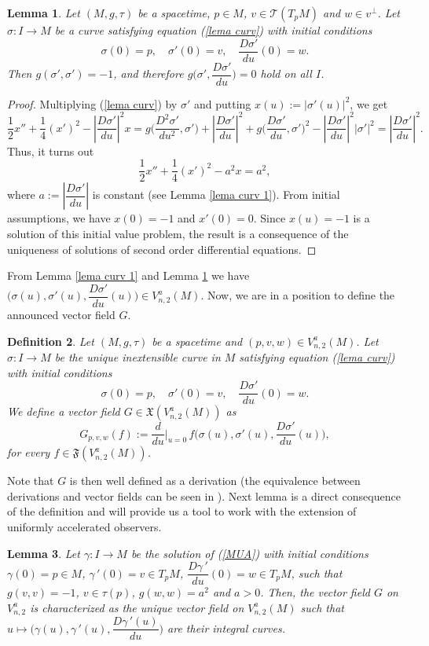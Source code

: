 \documentclass[11pt]{book}
\newtheorem{defi}{Definition}[chapter]
\newtheorem{lem}[defi]{Lemma}
\def\T{\mathcal T}
\def\F{\mathfrak F}
\def\x{\mathfrak X}
\begin{document}
\begin{lem}\label{lema curv 2}
	Let $(M,g,\tau)$ be a spacetime, $p\in M$, $v\in \T(T_{p}M)$ and $w\in v^\perp$.
	Let $\sigma:I\to M$ be a curve satisfying equation (\ref{lema curv}) with initial conditions 
	\[
	\sigma(0)=p, \quad \sigma'(0)=v, \quad \dfrac{D\sigma'}{du}(0)=w.
	\]
	Then $g(\sigma',\sigma')=-1$, and therefore $g\Big(\sigma',\dfrac{D\sigma'}{du}\Big)=0$ hold on all $I$.
\end{lem}
\begin{proof}
	Multiplying (\ref{lema curv}) by $\sigma'$ and putting $x(u):=|\sigma'(u)|^2$, we get
	\[
	\dfrac{1}{2} x'' +\dfrac{1}{4} (x')^2 - \left|\dfrac{D\sigma'}{du}\right|^2 x = g\Big(\dfrac{D^2\sigma'}{du^2},\sigma'\Big)+\left|\dfrac{D\sigma'}{du}\right|^2+g\Big(\dfrac{D\sigma'}{du},\sigma'\Big)^2-\left|\dfrac{D\sigma'}{du}\right|^2|\sigma'|^2 = \left|\dfrac{D\sigma'}{du}\right|^2.	
	\]
	Thus, it turns out
	\[
	\dfrac{1}{2} x'' +\dfrac{1}{4} (x')^2 -a^2 x= a^2,
	\]
	where $a:=\left|\dfrac{D\sigma'}{du}\right|$ is constant (see Lemma \ref{lema curv 1}).
	From initial assumptions, we have $x(0)=-1$ and $x'(0)=0$. Since $x(u)=-1$ is a solution of this initial value problem, the result is a consequence of the uniqueness of solutions of second order differential
	equations.
\end{proof}
From Lemma \ref{lema curv 1} and Lemma \ref{lema curv 2} we have $\Big(\sigma(u),\sigma'(u),\dfrac{D\sigma'}{du}(u)\Big)\in V_{n,2}^a(M)$. Now, we are in a position to define the announced vector field $G$.
\begin{defi}
	Let $(M,g,\tau)$ be a spacetime and $(p,v,w)\in V_{n,2}^a(M)$. Let $\sigma:I\to M$ be the unique inextensible curve in $M$ satisfying equation (\ref{lema curv}) with initial conditions
	\[
	\sigma(0)=p, \quad \sigma'(0)=v, \quad \dfrac{D\sigma'}{du}(0)=w.
	\]
	We define a vector field $G\in \x(V_{n,2}^a(M))$ as
	\[
	G_{p,v,w}(f):=\dfrac{d}{du}\Big|_{u=0}\,f\Big(\sigma(u),\sigma'(u),\dfrac{D\sigma'}{du}(u)\Big),
	\]
	for every $f\in \F(V_{n,2}^a(M))$.
\end{defi}
Note that $G$ is then well defined as a derivation (the equivalence between derivations and vector fields can be seen in \cite{SRG}). Next lemma is a direct consequence of the definition and will provide us a tool to work with the extension of uniformly accelerated observers.

\begin{lem}\label{campo G}
	Let $\gamma:I\to M$ be the solution of (\ref{MUA}) with initial conditions $\gamma(0)=p\in M$, $\gamma{\,'}(0)=v\in T_pM$, $\dfrac{D\gamma{\,'}}{du}(0)=w\in T_pM$, such that $g(v,v)=-1$, $v\in \tau(p)$, $g(w,w)=a^2$ and $a>0$. Then, the vector field $G$ on $V_{n,2}^a$ is characterized as the unique vector field on $V_{n,2}^a(M)$ such that $u\longmapsto \Big(\gamma(u), \gamma{\,'}(u), \dfrac{D\gamma{\,'}(u)}{du}\Big)$ are their integral curves.
\end{lem}
\end{document}
